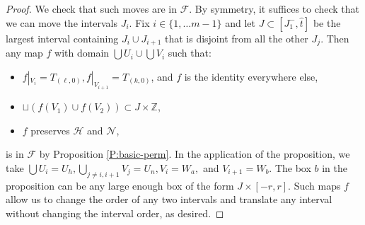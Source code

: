 \documentclass[10pt,a4paper]{amsart}
\newcommand{\X}{\times}
\newcommand{\Z}{\mathds{Z}}
\newcommand{\scrF}{\mathcal{F}}
\newcommand{\scrH}{\mathcal{H}}
\newcommand{\scrN}{\mathcal{N}}
\newcommand{\sset}{\subset}
\begin{document}
\begin{proof}
	We check that such moves are in $\scrF$. By symmetry, it suffices to check that we can move the intervals $J_i$. Fix $i \in \{1, \dots m-1\}$ and let $J \sset [J_1^-, \hat t]$ be the largest interval containing $J_i \cup J_{i+1}$ that is disjoint from all the other $J_j$.
	Then any map $f$ with domain $\bigcup U_i \cup \bigcup V_i$ such that:
	\begin{itemize}[nosep]
		\item $f|_{V_i} = T_{(\ell, 0)}, f|_{V_{i+1}} = T_{(k, 0)}$, and $f$ is the identity everywhere else,
		\item $\sqcup (f(V_1) \cup f(V_2)) \sset J \X \Z$,
		\item $f$ preserves $\scrH$ and $\scrN$,
	\end{itemize}
	is in $\scrF$ by Proposition \ref{P:basic-perm}. In the application of the proposition, we take $\bigcup U_i = U_h, \bigcup_{j \ne i, i+1} V_j = U_n, V_i = W_a,$ and $V_{i+1} = W_b$. The box $b$ in the proposition can be any large enough box of the form $J \X [-r, r]$. Such maps $f$ allow us to change the order of any two intervals and translate any interval without changing the interval order, as desired.
\end{proof}
\end{document}
